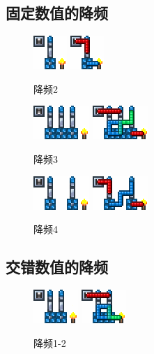 \subsection{固定数值的降频}
\begin{figure}
    \centering
    \includegraphics{images/327.png}
    \qquad
    \includegraphics{images/328.png}
    \caption{降频2}
\end{figure}
\begin{figure}
    \centering
    \includegraphics{images/331.png}
    \qquad
    \includegraphics{images/332.png}
    \caption{降频3}
\end{figure}
\begin{figure}
    \centering
    \includegraphics{images/334.png}
    \qquad
    \includegraphics{images/333.png}
    \caption{降频4}
\end{figure}
\subsection{交错数值的降频}
\begin{figure}
    \centering
    \includegraphics{images/330.png}
    \qquad
    \includegraphics{images/329.png}
    \caption{降频1-2}
\end{figure}
